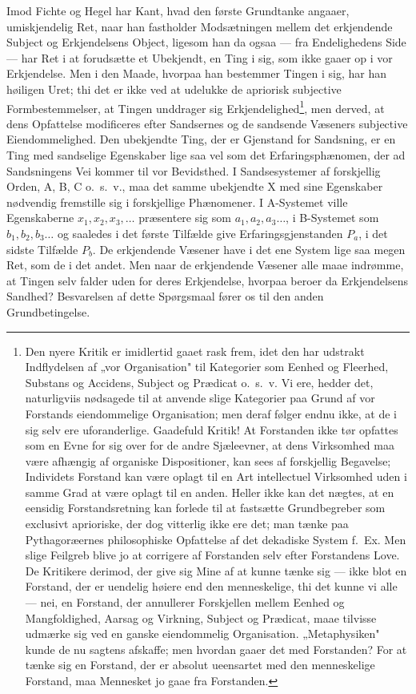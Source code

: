 \documentclass[12pt]{article}
\newcommand{\opage}[1]{\marginnote{\footnotesize\textit{[#1]}}}
\begin{document}
\opage{24} Imod Fichte og Hegel har Kant, hvad den første Grundtanke
angaaer, umiskjendelig Ret, naar han fastholder Modsætningen
mellem det erkjendende Subject og Erkjendelsens Object,
ligesom han da ogsaa --- fra Endelighedens Side --- har Ret i
at forudsætte et Ubekjendt, en Ting i sig, som ikke gaaer op i
vor Erkjendelse. Men i den Maade, hvorpaa han bestemmer
Tingen i sig, har han høiligen Uret; thi det er ikke ved at
udelukke de apriorisk subjective Formbestemmelser, at Tingen
unddrager sig Erkjendelighed\footnote{Den nyere Kritik er imidlertid
gaaet rask frem, idet den har udstrakt Indflydelsen af „vor Organisation"
til Kategorier som Eenhed og Fleerhed, Substans og Accidens, Subject og
Prædicat o.\ s.\ v. Vi ere, hedder det, naturligviis nødsagede til at
anvende slige Kategorier paa Grund af vor Forstands eiendommelige
Organisation; men deraf følger endnu ikke, at de i sig selv ere
uforanderlige. Gaadefuld Kritik! At Forstanden ikke tør opfattes som en
Evne for sig over for de andre Sjæleevner, at dens Virksomhed maa være
afhængig af organiske Dispositioner, kan sees af forskjellig Begavelse;
Individets Forstand kan være oplagt til en Art intellectuel Virksomhed
uden i samme Grad at være oplagt til en anden. Heller ikke kan det
nægtes, at en eensidig Forstandsretning kan forlede til at fastsætte
Grundbegreber som exclusivt aprioriske, der dog vitterlig ikke ere det;
man tænke paa Pythagoræernes philosophiske Opfattelse af det dekadiske
System f.\ Ex. Men slige Feilgreb blive jo at corrigere af Forstanden selv
efter Forstandens Love. De Kritikere derimod, der give sig Mine af at
kunne tænke sig --- ikke blot en Forstand, der er uendelig høiere end den
menneskelige, thi det kunne vi alle --- nei, en Forstand, der annullerer
Forskjellen mellem Eenhed og Mangfoldighed, Aarsag og Virkning, Subject
og Prædicat, maae tilvisse udmærke sig ved en ganske eiendommelig
Organisation. „Metaphysiken" kunde de nu sagtens afskaffe; men hvordan
gaaer det med Forstanden? For at tænke sig en Forstand, der er absolut
ueensartet med den menneskelige Forstand, maa Mennesket jo gaae fra
Forstanden.}, men derved, at dens Opfattelse
modificeres efter Sandsernes og de sandsende Væseners
subjective Eiendommelighed. Den ubekjendte Ting, der er Gjenstand
for Sandsning, er en Ting med sandselige Egenskaber lige saa
vel som det Erfaringsphænomen, der ad Sandsningens Vei
kommer til vor Bevidsthed. I Sandsesystemer af forskjellig
Orden, A, B, C o.\ s.\ v., maa det samme ubekjendte X med sine
Egenskaber nødvendig fremstille sig i forskjellige Phænomener.
I A-Systemet ville Egenskaberne $x_1, x_2, x_3, \ldots$ præsentere sig
\opage{25} som $a_1, a_2, a_3\ldots$, i B-Systemet som $b_1, b_2, b_3\ldots$ og
saaledes i det første Tilfælde give Erfaringsgjenstanden $P_a$,
i det sidste Tilfælde $P_b$. De erkjendende Væsener have i det
ene System lige saa megen Ret, som de i det andet. Men
naar de erkjendende Væsener alle maae indrømme, at Tingen
selv falder uden for deres Erkjendelse, hvorpaa beroer da
Erkjendelsens Sandhed? Besvarelsen af dette Spørgsmaal fører
os til den anden Grundbetingelse.
\end{document}
